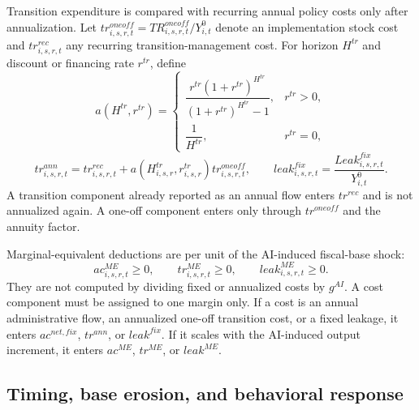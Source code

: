 \documentclass[11pt,a4paper]{article}
\begin{document}
Transition expenditure is compared with recurring annual policy costs only after annualization. Let $tr^{oneoff}_{i,s,r,t}=TR^{oneoff}_{i,s,r,t}/Y^0_{i,t}$ denote an implementation stock cost and $tr^{rec}_{i,s,r,t}$ any recurring transition-management cost. For horizon $H^{tr}$ and discount or financing rate $r^{tr}$, define
\begin{equation}\label{eq:transition_annualization_v21}
    a(H^{tr},r^{tr})=\begin{cases}
    \dfrac{r^{tr}(1+r^{tr})^{H^{tr}}}{(1+r^{tr})^{H^{tr}}-1}, & r^{tr}>0,\\[6pt]
    \dfrac{1}{H^{tr}}, & r^{tr}=0,
    \end{cases}
\end{equation}
\begin{equation}\label{eq:annualized_transition_v21}
    tr^{ann}_{i,s,r,t}=tr^{rec}_{i,s,r,t}+a(H^{tr}_{i,s,r},r^{tr}_{i,s,r})tr^{oneoff}_{i,s,r,t},
    \qquad
    leak^{fix}_{i,s,r,t}=\frac{Leak^{fix}_{i,s,r,t}}{Y^0_{i,t}}.
\end{equation}
A transition component already reported as an annual flow enters $tr^{rec}$ and is not annualized again. A one-off component enters only through $tr^{oneoff}$ and the annuity factor.

Marginal-equivalent deductions are per unit of the AI-induced fiscal-base shock:
\begin{equation}\label{eq:marginal_equiv_costs_v17}
    ac^{ME}_{i,s,r,t}\geq0,
    \qquad tr^{ME}_{i,s,r,t}\geq0,
    \qquad leak^{ME}_{i,s,r,t}\geq0.
\end{equation}
They are not computed by dividing fixed or annualized costs by $g^{AI}$. A cost component must be assigned to one margin only. If a cost is an annual administrative flow, an annualized one-off transition cost, or a fixed leakage, it enters $ac^{net,fix}$, $tr^{ann}$, or $leak^{fix}$. If it scales with the AI-induced output increment, it enters $ac^{ME}$, $tr^{ME}$, or $leak^{ME}$.

\subsection{Timing, base erosion, and behavioral response}
\end{document}
